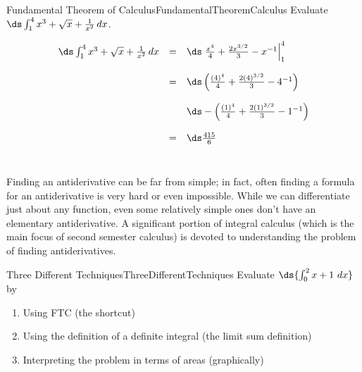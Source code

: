\begin{example}{Fundamental Theorem of Calculus}{FundamentalTheoremCalculus}
Evaluate $\ds\int_1^4 x^3+\sqrt{x}+\frac{1}{x^2}\,dx $.
\end{example}

\begin{solution}
\[ \begin{array}{lcl}
\ds\int_1^4 x^3+\sqrt{x}+\frac{1}{x^2}\,dx 
	& = & \ds\left.\frac{x^4}{4}+\frac{2x^{3/2}}{3}-x^{-1}\right|_1^4\\
\\
	& = & \ds\left(\frac{(4)^4}{4}+\frac{2(4)^{3/2}}{3}-4^{-1}\right) \\
\\
	& & \ds-\left(\frac{(1)^4}{4}+\frac{2(1)^{3/2}}{3}-1^{-1}\right)\\
\\
	& = & \ds\frac{415}{6}
\end{array}\]\
\end{solution}

Finding an antiderivative can be far from simple; in fact, often finding a formula for an antiderivative is very hard or even impossible.  While we can differentiate just about any function, even some relatively simple ones don't have an elementary antiderivative.  A significant portion of integral calculus (which is the main focus of second semester calculus) is devoted to understanding the problem of finding antiderivatives. 

\begin{example}{Three Different Techniques}{ThreeDifferentTechniques}
Evaluate $\ds{\int_0^2 x+1~dx}$ by
\begin{enumerate}
\item Using FTC (the shortcut)
\item Using the definition of a definite integral (the limit sum definition)
\item Interpreting the problem in terms of areas (graphically)
\end{enumerate}
\end{example}

